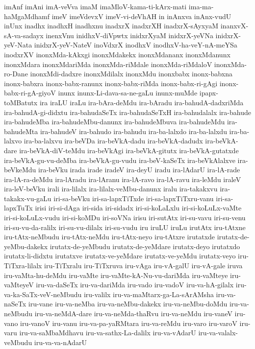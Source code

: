 {imAnf
imAni
imA-veVva
imaM
imaMloV-kama-ti-kArx-mati
ima-ma-haMgaMdhamf
imeV
imeVdevxV
imeV-vi-deVhAH
in
inAnxva
inAnx-vudU
inUnx
inadhx
inadhxH
inadhxnu
inadxrX
inadxrXH
inadxrX-sAyxyaM
inanxvX-sA-va-sadayx
inenxVnu
inidhxV-diVpwtx
inidxrXyaM
inidxrX-yeVNa
inidxrX-yeV-Nata
inidxrX-yeV-NateV
inoVdxrX
inodhxV
inodhxV-ha-veY-nA-meYSa
inodxrXV
inonxMda-kAkxgi
inonxMdakekx
inonxMdananx
inonxMdanunx
inonxMdara
inonxMdariMda
inonxMda-riMdale
inonxMda-riMdaloV
inonxMda-ro-Dane
inonxMdi-dadxre
inonxMdilalx
inonxMdu
inonxbabx
inonx-babxna
inonx-babxra
inonx-babx-ranunx
inonx-babx-riMda
inonx-babx-ri-gAgi
inonx-babx-ri-gA-giyoV
inunx
inunx-Li-dava-sa-ne-gaLu
inunx-muMde
ipapx-toMBatutx
ira
iraLU
iraLu
ira-bAra-deMdu
ira-bAradu
ira-bahudA-dadxriMda
ira-bahudA-gi-didxtu
ira-bahudaSeTx
ira-bahudaSeTxH
ira-bahudalalx
ira-bahude
ira-bahudeMba
ira-bahudeMbu-danunx
ira-bahudeMbuva
ira-bahudeMdu
ira-bahudeMta
ira-bahudeV
ira-bahudo
ira-bahudu
ira-ba-lalxdo
ira-ba-lalxdu
ira-ba-lalxvo
ira-ba-lalxvu
ira-beVDa
ira-beVkA-dadu
ira-beVkA-dadudx
ira-beVkA-dare
ira-beVkA-diV-teMdu
ira-beVkAgi
ira-beVkA-gitutx
ira-beVkA-gutatxde
ira-beVkA-gu-vu-deMba
ira-beVkA-gu-vudu
ira-beV-kaSeTx
ira-beVkAlalxve
ira-beVkeMdu
ira-beVku
irada
irade
iradeV
ira-deyU
iradu
ira-lAdarU
ira-lA-rade
ira-lA-ra-deMdu
ira-lAradu
ira-lAranu
ira-lA-ravo
ira-lA-ravu
ira-leMdu
iraleV
ira-leV-beVku
irali
ira-lilalx
ira-lilalx-veMbu-danunx
iralu
ira-takakxvu
ira-takakx-vu-gaLu
iri-sa-beVku
iri-sa-lapxTiTxde
iri-sa-lapxTiTxru-vanu
iri-sa-lapxTuTx
irisi
iri-si-dAga
iri-sida
iri-sidadx
iri-si-koLaLxlu
iri-si-koLuLx-vaMte
iri-si-koLuLx-vudu
iri-si-koMDu
iri-soVNa
irisu
iri-sutAtx
iri-su-vavu
iri-su-venu
iri-su-vu-da-ralilx
iri-su-vu-dilalx
iri-su-vudu
iru
iruLU
iruLu
irutAtx
iru-tAtxne
iru-tAtx-neMbudu
iru-tAtx-neMdu
iru-tAtx-neyo
iru-tAtxre
irutatxde
irutatx-de-yeMbu-dakekx
irutatx-de-yeMbudu
irutatx-de-yeMdare
irutatx-deyo
irutatxdo
irutatx-li-didxtu
irutatxve
irutatx-ve-yeMdare
irutatx-ve-yeMdu
irutatx-veyo
iru-TiTxra-lilalx
iru-TiTxralu
iru-TiTxruva
iru-vAga
iru-vA-galU
iru-vA-gale
iruva
iru-vaMta-hu-deMdu
iru-vaMte
iru-vaMte-kA-Nu-vu-dariMda
iru-vaMteye
iru-vaMteyeV
iru-va-daSeTx
iru-va-dariMda
iru-vado
iru-vadoV
iru-va-hA-gilalx
iru-va-ka-SaTx-veV-neMbudu
iru-valilx
iru-va-maMtarx-ga-La-sArAMsha
iru-va-naSeTx
iru-vane
iru-va-neMba
iru-va-neMbu-dakekx
iru-va-neMbu-doMdu
iru-va-neMbudu
iru-va-neMdA-dare
iru-va-neMda-thaRvu
iru-va-neMdu
iru-vaneV
iru-vano
iru-vanoV
iru-vanu
iru-va-pa-yaRMtara
iru-va-reMdu
iru-varo
iru-varoV
iru-varu
iru-va-saMbaMdhavu
iru-va-sathx-La-dalilx
iru-va-vAdarU
iru-va-valalx-veMbudu
iru-va-va-nAdarU
}
